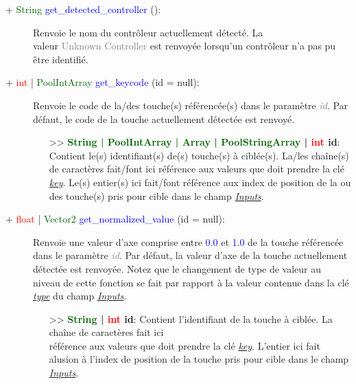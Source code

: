 \documentclass[a4paper, 11pt]{article}
\begin{document}
	\begin{description}
		\item [+ \textcolor{darkgreen}{String} \textcolor{blue}{get\_detected\_controller} ():] Renvoie le 
		nom du contrôleur actuellement détecté. La \\valeur \textcolor{gray}{Unknown Controller} est 
		renvoyée lorsqu'un contrôleur n'a pas pu être identifié.\\
	\end{description}
	\begin{description}
		\item [+ \textcolor{red}{int} | \textcolor{darkgreen}{PoolIntArray} \textcolor{blue}{get\_keycode} 
		(id = null):] Renvoie le code de la/des touche(s) référencée(s) dans le paramètre \textcolor{gray}
		{\textit{id}}. Par défaut, le code de la touche actuellement détectée est renvoyé.
		\begin{itemize}
			\item [>> \textbf{\textcolor{darkgreen}{String | PoolIntArray | Array | PoolStringArray} |
			\textcolor{red}{int} id}:] Contient le(s) identifiant(s) de(s) touche(s) à ciblée(s). La/les 
			chaîne(s) de caractères fait/font ici référence aux valeurs que doit prendre la clé 
			\textit{\hyperlink{key}{key}}. Le(s) entier(s) ici fait/font référence aux index de position de 
			la ou des touche(s) pris pour cible dans le champ \textit{\hyperlink{inputs}{Inputs}}.\\
		\end{itemize}
	\end{description}
	\begin{description}
		\item [+ \textcolor{red}{float} | \textcolor{darkgreen}{Vector2} \textcolor{blue}
		{get\_normalized\_value} (id = null):] Renvoie une valeur d'axe comprise entre \textcolor{blue}{0.0} 
		et \textcolor{blue}{1.0} de la touche référencée dans le paramètre \textcolor{gray}{\textit{id}}. 
		Par défaut, la valeur d'axe de la touche actuellement détectée est renvoyée. Notez que le changement 
		de type de valeur au niveau de cette fonction se fait par rapport à la valeur contenue dans la clé 
		\textit{\hyperlink{type}{type}} du champ \textit{\hyperlink{inputs}{Inputs}}.
		\begin{itemize}
			\item [>> \textbf{\textcolor{darkgreen}{String} | \textcolor{red}{int} id}:] Contient 
			l'identifiant de la touche à ciblée. La chaîne de caractères fait ici \\référence aux valeurs 
			que doit prendre la clé \textit{\hyperlink{key}{key}}. L'entier ici fait alusion à l'index de 
			position de la touche pris pour cible dans le champ \textit{\hyperlink{inputs}{Inputs}}.\\
		\end{itemize}
	\end{description}
\end{document}
